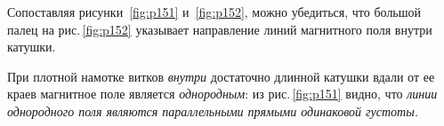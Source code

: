 \documentclass[main.tex]{subfiles}
\begin{document}
Сопоставляя рисунки~\ref{fig:p151} и~\ref{fig:p152}, можно убедиться, что большой палец на рис.\,\ref{fig:p152} указывает направление линий магнитного поля внутри катушки.

При плотной намотке витков \emph{внутри} достаточно длинной катушки вдали от ее краев магнитное поле является \emph{однородным}: из рис.\,\ref{fig:p151} видно, что \emph{линии однородного поля являются параллельными прямыми одинаковой густоты.} 

























 
\end{document}
